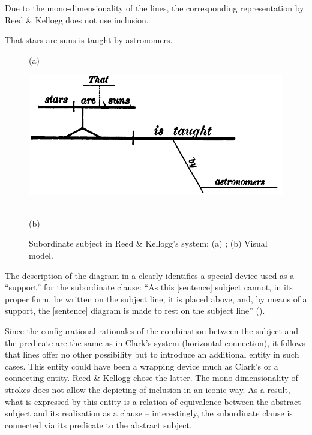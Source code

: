 \documentclass[english,output=paper,colorlinks,citecolor=brown]{../langscibook}
\begin{document}
Due to the mono-dimensionality of the lines, the corresponding representation by Reed \& Kellogg does not use inclusion.

\ea \label{ex:4:5} That stars are suns is taught by astronomers. \z


\begin{figure}
     (a) \hspace{1em} \begin{minipage}[c]{.45\textwidth}\includegraphics[width=\textwidth]{figures/04/ReedKellog4.png}\end{minipage}\medskip\\
     (b) \hspace{1em} 
    \caption{Subordinate subject in Reed \& Kellogg’s system: (a) \citeyear[81]{ReedBrainerd1879}; (b) Visual model.\label{fig:4:10}}
\end{figure}

The description of the diagram in a clearly identifies a special device used as a “support” for the subordinate clause: “As this [sentence] subject cannot, in its proper form, be written on the subject line, it is placed above, and, by means of a support, the [sentence] diagram is made to rest on the subject line” (\citealt[107]{ReedBrainerd1879}).

Since the configurational rationales of the combination between the subject and the predicate are the same as in Clark’s system (horizontal connection), it follows that lines offer no other possibility but to introduce an additional entity in such cases. This entity could have been a wrapping device much as Clark’s or a connecting entity. Reed \& Kellogg chose the latter. The mono-dimensionality of strokes does not allow the depicting of inclusion in an iconic way. As a result, what is expressed by this entity is a relation of equivalence between the abstract subject and its realization as a clause – interestingly, the subordinate clause is connected via its predicate to the abstract subject.
\end{document}
